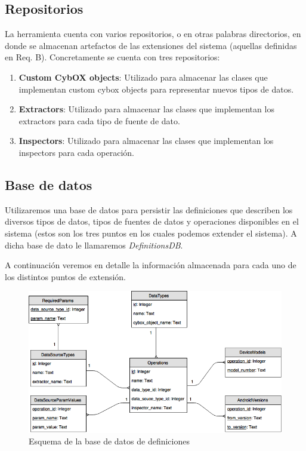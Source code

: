 \subsection{Repositorios} \label{repositorios}
La herramienta cuenta con varios repositorios, o en otras palabras directorios, en donde se almacenan artefactos de las extensiones del sistema (aquellas definidas en Req. B). Concretamente se cuenta con tres repositorios:

\begin{enumerate}
\item \textbf{Custom CybOX objects}: Utilizado para almacenar las clases que implementan custom cybox objects para representar nuevos tipos de datos.
\item \textbf{Extractors}: Utilizado para almacenar las clases que implementan los extractors para cada tipo de fuente de dato.
\item \textbf{Inspectors}: Utilizado para almacenar las clases que implementan los inspectors para cada operación.
\end{enumerate}

\subsection{Base de datos}
Utilizaremos una base de datos para persistir las definiciones que describen los diversos tipos de datos, tipos de fuentes de datos y operaciones disponibles en el sistema (estos son los tres puntos en los cuales podemos extender el sistema). A dicha base de dato le llamaremos \emph{DefinitionsDB}.

A continuación veremos en detalle la información almacenada para cada uno de los distintos puntos de extensión.
\newline

\begin{figure}[H]
    \begin{center}
        \includegraphics[width=\textwidth]{figures/esquema_de_base_de_datos}
        \caption{Esquema de la base de datos de definiciones}
    \end{center}
\end{figure}

